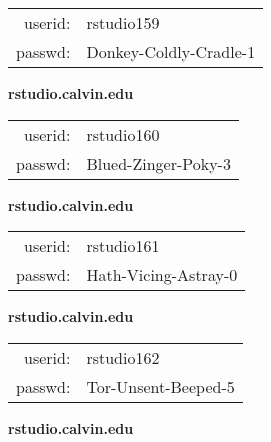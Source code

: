 \documentclass{article}\usepackage[]{graphicx}\usepackage[]{color}
\begin{document}
\begin{multicols}{3}
\begin{minipage}{.3\textwidth}
\begin{tabular}{rl}
userid: & rstudio159\\
passwd: & Donkey-Coldly-Cradle-1

\vspace{5mm}

\end{tabular}\end{minipage}

\vspace{5mm}

\begin{minipage}{.3\textwidth}
\centerline{\textbf{rstudio.calvin.edu}}
\medskip
\begin{tabular}{rl}

userid: & rstudio160\\
passwd: & Blued-Zinger-Poky-3

\vspace{5mm}

\end{tabular}\end{minipage}

\vspace{5mm}

\begin{minipage}{.3\textwidth}
\centerline{\textbf{rstudio.calvin.edu}}
\medskip
\begin{tabular}{rl}

userid: & rstudio161\\
passwd: & Hath-Vicing-Astray-0

\vspace{5mm}

\end{tabular}\end{minipage}

\vspace{5mm}

\begin{minipage}{.3\textwidth}
\centerline{\textbf{rstudio.calvin.edu}}
\medskip
\begin{tabular}{rl}

userid: & rstudio162\\
passwd: & Tor-Unsent-Beeped-5

\vspace{5mm}

\end{tabular}\end{minipage}

\vspace{5mm}

\begin{minipage}{.3\textwidth}
\centerline{\textbf{rstudio.calvin.edu}}
\medskip
\begin{tabular}{rl}


\end{tabular}
\end{minipage}
\end{multicols}
\end{document}
